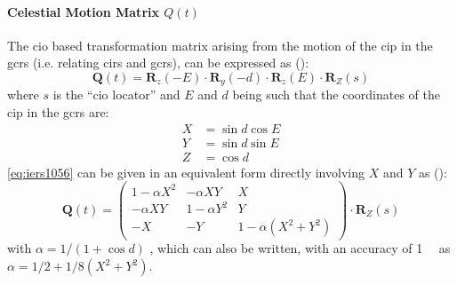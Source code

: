 \paragraph{Celestial Motion Matrix $Q(t)$}\label{par:celestial-motion-matrix}
The \gls{cio} based transformation matrix arising from the motion of the \gls{cip} 
in the \gls{gcrs} (i.e. relating \gls{cirs} and \gls{gcrs}), can be expressed as
(\cite{iers2010}):
\begin{equation}
  \bm{Q}(t) = \bm{R}_z (-E) \cdot 
              \bm{R}_y (-d) \cdot 
              \bm{R}_z (E) \cdot 
              \bm{R}_Z (s)
  \label{eq:iers1056}
\end{equation}
where $s$ is the ``\gls{cio} locator'' and $E$ and $d$ being such that the 
coordinates of the \gls{cip} in the \gls{gcrs} are:
\begin{equation}
  \begin{aligned}
    X & = \sin{d} \cos{E} \\
    Y & = \sin{d} \sin{E} \\
    Z & = \cos{d}
  \end{aligned}
\end{equation}
\autoref{eq:iers1056} can be given in an equivalent form directly involving $X$ and 
$Y$ as (\cite{iers2010}):
\begin{equation}
  \bm{Q}(t) = \begin{pmatrix}
    1-\alpha X^2 & -\alpha XY & X \\
    -\alpha XY & 1-\alpha Y^2 & Y \\
    -X & -Y & 1-\alpha (X^2 + Y^2) \end{pmatrix}
    \cdot \bm{R}_Z (s)
    \label{eq:iers10510}
\end{equation}
with $\alpha = 1/(1+\cos{d})$ , which can also be written, with an accuracy of 
\SI{1}{\micro\larcsecond} as $\alpha = 1/2 + 1/8(X^2 + Y^2)$.

